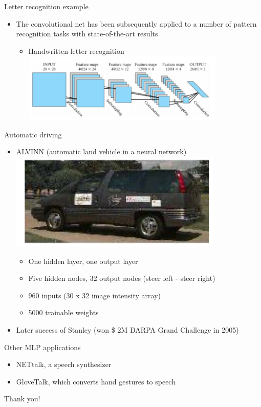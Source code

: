 \documentclass[notes]{beamer}
\newcommand{\chuhao}{\fontsize{44.9pt}{\baselineskip}\selectfont}
\providecommand{\tightlist}{%
  \setlength{\itemsep}{0pt}\setlength{\parskip}{0pt}}
\begin{document}
\begin{frame}{Letter recognition example}

\begin{itemize}
\tightlist
\item
  The convolutional net has been subsequently applied to a number of
  pattern recognition tasks with state-of-the-art results

  \begin{itemize}
  \tightlist
  \item
    Handwritten letter recognition
    \includegraphics[width=0.80000\textwidth]{2018-03-10-16-09-17.png}
  \end{itemize}
\end{itemize}

\end{frame}

\begin{frame}{Automatic driving}

\begin{itemize}
\tightlist
\item
  ALVINN (automatic land vehicle in a neural network)
  \includegraphics[width=0.80000\textwidth]{2018-03-10-16-09-46.png}

  \begin{itemize}
  \tightlist
  \item
    One hidden layer, one output layer
  \item
    Five hidden nodes, 32 output nodes (steer left - steer right)
  \item
    960 inputs (30 x 32 image intensity array)
  \item
    5000 trainable weights
  \end{itemize}
\item
  Later success of Stanley (won \$ 2M DARPA Grand Challenge in 2005)
\end{itemize}

\end{frame}

\begin{frame}{Other MLP applications}

\begin{itemize}
\tightlist
\item
  NETtalk, a speech synthesizer
\item
  GloveTalk, which converts hand gestures to speech
\end{itemize}

\end{frame}
\begin{frame}
	\chuhao Thank you! %
\end{frame}
\end{document}
